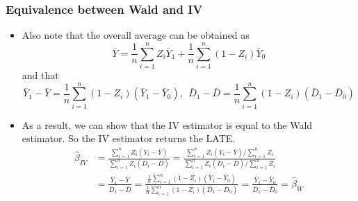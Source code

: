 \documentclass[aspectratio=169]{beamer}
\begin{document}
\begin{frame}
\frametitle{Equivalence between Wald and IV}
\begin{itemize}
\item Also note that the overall average can be obtained as
\[
\bar{Y}=\frac{1}{n}\sum_{i=1}^nZ_i\bar{Y}_{1}+\frac{1}{n}\sum_{i=1}^n(1-Z_i)\bar{Y}_{0}
\]
and that 
\[
\bar{Y}_1-\bar{Y}=\frac{1}{n}\sum_{i=1}^n(1-Z_i)(\bar{Y}_1-\bar{Y}_0),\ \ \bar{D}_1-\bar{D}=\frac{1}{n}\sum_{i=1}^n(1-Z_i)(\bar{D}_1-\bar{D}_0)
\]
\item As a result, we can show that the IV estimator is equal to the Wald estimator. So the IV estimator returns the LATE. 
\[
\begin{aligned}
\hat{\beta}_{IV}&=\frac{\sum_{i=1}^n Z_i(Y_i-\bar{Y})}{\sum_{i=1}^n Z_i(D_i-\bar{D})} =\frac{\sum_{i=1}^n Z_i(Y_i-\bar{Y})/\sum_{i=1}^nZ_i}{\sum_{i=1}^n Z_i(D_i-\bar{D})/\sum_{i=1}^nZ_i} \\
&=\frac{\bar{Y}_1-\bar{Y}}{\bar{D}_1-\bar{D}}=\frac{\frac{1}{n}\sum_{i=1}^n(1-Z_i)(\bar{Y}_1-\bar{Y}_0)}{\frac{1}{n}\sum_{i=1}^n(1-Z_i)(\bar{D}_1-\bar{D}_0)}=\frac{\bar{Y}_1-\bar{Y}_0}{\bar{D}_1-\bar{D}_0}=\hat{\beta}_W \\
\end{aligned}
\]
\end{itemize}
\end{frame}
\end{document}
